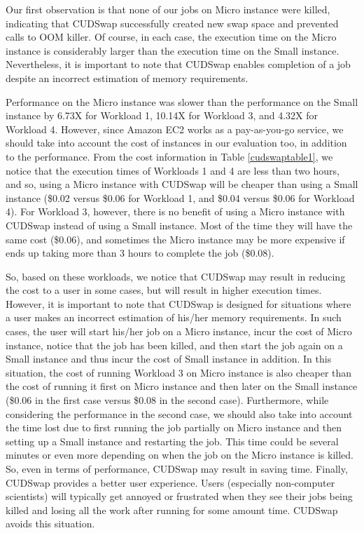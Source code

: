 Our first observation is that none of our jobs on Micro instance were
killed, indicating that CUDSwap successfully created new swap space and
prevented calls to OOM killer. Of course, in each case, the execution time
on the Micro instance is considerably larger than the execution time on the
Small instance. Nevertheless, it is important to note that CUDSwap
enables completion of a job despite an incorrect estimation of memory
requirements.

Performance on the Micro instance was slower than the performance on the
Small instance by 6.73X for Workload 1, 10.14X for Workload 3, and 4.32X
for Workload 4. However, since Amazon EC2 works as a pay-as-you-go service,
we should take into account the cost of instances in our evaluation too,
in addition to the performance. From the cost information in Table
\ref{cudswaptable1}, we notice that the execution times of Workloads 1
and 4 are less than two hours, and so, using a Micro instance with CUDSwap
will be cheaper than using a Small instance (\$0.02 versus \$0.06 for
Workload 1, and \$0.04 versus \$0.06 for Workload 4).
For Workload 3, however, there is no benefit of using a Micro instance
with CUDSwap instead of using a Small instance. Most of the time they will
have the same cost (\$0.06), and sometimes the Micro instance may be more
expensive if ends up taking more than 3 hours to complete the job (\$0.08).

So, based on these workloads, we notice that CUDSwap may result in reducing
the cost to a user in some cases, but will result in higher execution times.
However, it is important to note that CUDSwap is designed for situations
where a user makes an incorrect estimation of his/her memory requirements.
In such cases, the user will start his/her job on a Micro instance, incur
the cost of Micro instance, notice that the job has been killed, and then
start the job again on a Small instance and thus incur the cost of Small
instance in addition. In this situation, the cost of running Workload 3
on Micro instance is also cheaper than the cost of running it first
on Micro instance and then later on the Small instance (\$0.06 in the first
case versus \$0.08 in the second case). Furthermore, while considering the
performance in the second case, we should also take into account the time
lost due to first running the job partially on Micro instance and then
setting up a Small instance and restarting the job. This time could be
several minutes or even more depending on when the job on the Micro instance
is killed. So, even in terms of performance, CUDSwap may result in saving
time. Finally, CUDSwap provides a better user experience. Users
(especially non-computer scientists) will typically get annoyed or
frustrated when they see their jobs being killed and losing all the
work after running for some amount time. CUDSwap avoids this situation.

